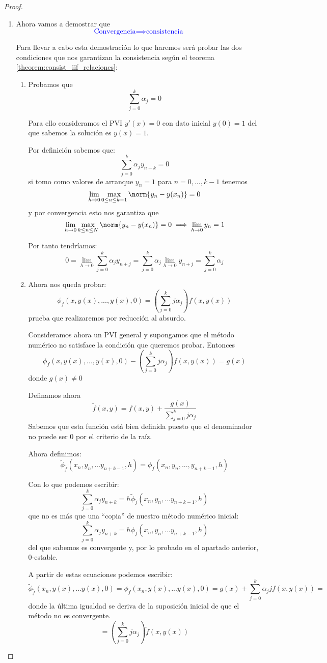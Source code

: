 \begin{proof}
\begin{itemize}
\begin{enumerate}
\item Ahora vamos a demostrar que
\textcolor{blue}{\[\text{Convergencia} \implies \text{consistencia}\]}

Para llevar a cabo esta demostración lo que haremos será probar las dos condiciones que nos garantizan la consistencia según el teorema \ref{theorem:consist_iif_relaciones}:
\begin{enumerate}
\item Probamos que
\[\sum_{j=0}^kα_j = 0\]

Para ello consideramos el PVI $y'(x)=0$ con dato inicial $y(0)=1$ del que sabemos la solución es $y(x)=1$.

Por definición sabemos que:
\[\sum_{j=0}^kα_jy_{n+k}=0\]
si tomo como valores de arranque $y_n=1$ para $n=0,...,k-1$ tenemos
\[\lim_{h \to 0} \max_{0 \leq n \leq k-1} \norm{y_n-y(x_n)} = 0\]
y por convergencia esto nos garantiza que 
\[\lim_{h \to 0} \max_{k \leq n \leq N} \norm{y_n-y(x_n)} = 0 \implies \lim_{h\to 0}y_n = 1\]

Por tanto tendríamos:
\[0 = \lim_{h \to 0} \sum_{j=0}^kα_jy_{n+j} = \sum_{j=0}^k α_j\lim_{h\to 0} y_{n+j} = \sum_{j=0}^kα_j\]

\item Ahora nos queda probar:
\[\phi_f(x,y(x),...,y(x),0)=\left( \sum_{j=0}^kjα_j\right)f(x,y(x))\]
prueba que realizaremos por reducción al absurdo.

Consideramos ahora un PVI general y supongamos que el método numérico no satisface la condición que queremos probar. Entonces
\[\phi_f(x,y(x),...,y(x),0)-\left( \sum_{j=0}^kjα_j\right)f(x,y(x)) = g(x)\]
donde $g(x)\neq 0$

Definamos ahora 
\[\tilde{f}(x,y) = f(x,y)+\frac{g(x)}{\sum_{j=0}^kjα_j}\]
\obs Sabemos que esta función está bien definida puesto que el denominador no puede ser 0 por el criterio de la raíz.

Ahora definimos:
\[\tilde{\phi}_{\tilde{f}}(x_n,y_n,...y_{n+k-1},h)=\phi_f(x_n,y_n,...,y_{n+k-1},h)\]

Con lo que podemos escribir:
\[\sum_{j=0}^kα_jy_{n+k} = h \tilde{\phi}_{\tilde{f}}(x_n,y_n,...y_{n+k-1},h)\]
que no es más que una ``copia'' de nuestro método numérico inicial:
\[\sum_{j=0}^kα_jy_{n+k} = h \phi_{f}(x_n,y_n,...y_{n+k-1},h)\]
del que sabemos es convergente y, por lo probado en el apartado anterior, 0-estable.

A partir de estas ecuaciones podemos escribir:
\[\tilde{\phi}_{\tilde{f}}(x_n,y(x),...y(x),0) =  \phi_{f}(x_n,y(x),...y(x),0) = g(x)+\sum_{j=0}^kα_{j}jf(x,y(x))=\]
donde la última igualdad se deriva de la suposición inicial de que el método no es convergente.
\[=\left( \sum_{j=0}^kjα_j\right)\tilde{f}(x,y(x))\]


\end{enumerate}
\end{enumerate}
\end{itemize}
\end{proof}
